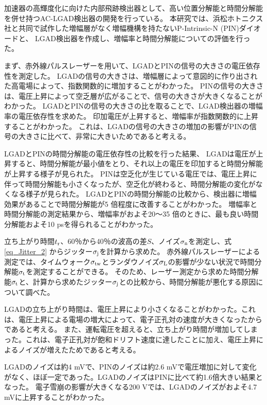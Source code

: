 加速器の高輝度化に向けた内部飛跡検出器として、高い位置分解能と時間分解能を併せ持つAC-LGAD検出器の開発を行っている。
本研究では、浜松ホトニクス社と共同で試作した増幅層がなく増幅機構を持たないP-Intrinsic-N (PIN)ダイオードと、
LGAD検出器を作成し、増幅率と時間分解能についての評価を行った。

まず、赤外線パルスレーザーを用いて、LGADとPINの信号の大きさの電圧依存性を測定した。
LGADの信号の大きさは、増幅層によって意図的に作り出された高電場によって、指数関数的に増加することがわかった。
PINの信号の大きさは、電圧上昇によって空乏層が広がることで、信号の大きさが大きくなることがわかった。
LGADとPINの信号の大きさの比を取ることで、LGAD検出器の増幅率の電圧依存性を求めた。
印加電圧が上昇すると、増幅率が指数関数的に上昇することがわかった。
これは、LGADの信号の大きさの増加の影響がPINの信号の大きさに比べて、非常に大きいためであると考える。

LGADとPINの時間分解能の電圧依存性の比較を行った結果、
LGADは電圧が上昇すると、時間分解能が最小値をとり、それ以上の電圧を印加すると時間分解能が上昇する様子が見られた。
PINは空乏化が生じている電圧では、電圧上昇に伴って時間分解能も小さくなったが、空乏化が終わると、時間分解能の変化がなくなる様子が見られた。
LGADとPINの時間分解能の比較から、検出器に増幅効果があることで時間分解能が5 倍程度に改善することがわかった。
増幅率と時間分解能の測定結果から、増幅率がおよそ20〜35 倍のときに、最も良い時間分解能およそ10 psを得られることがわかった。

立ち上がり時間$t_{\rm{r}}$、60％から40％の波高の差$S$、ノイズ$\sigma_{\rm{n}}$を測定し、式\ref{eq_Jitter_2} からジッター$\sigma_{\rm{j}}$を計算から求めた。
赤外線パルスレーザーによる測定では、タイムウォーク$\sigma_{\rm{tw}}$とランダウノイズ$\sigma_{\rm{L}}$の影響が少ない状況で時間分解能$\sigma_{\rm{t}}$を測定することができる。
そのため、レーザー測定から求めた時間分解能$\sigma_{\rm{t}}$と、計算から求めたジッター$\sigma_{\rm{j}}$との比較から、時間分解能が悪化する原因について調べた。

LGADの立ち上がり時間は、電圧上昇により小さくなることがわかった。これは、電圧上昇による電場の増大によって、電子正孔対の速度が大きくなったからであると考える。
また、運転電圧を超えると、立ち上がり時間が増加してしまった。これは、電子正孔対が飽和ドリフト速度に達したことに加え、電圧上昇によるノイズが増えたためであると考える。

LGADのノイズは約4 mVで、PINのノイズは約2.6 mVで電圧増加に対して変化がなく、ほぼ一定であった。LGADのノイズはPINに比べて約1.6倍大きい結果となった。
電子雪崩の影響が大きくなる200 Vでは、LGADのノイズがおよそ4.7 mVに上昇することがわかった。

